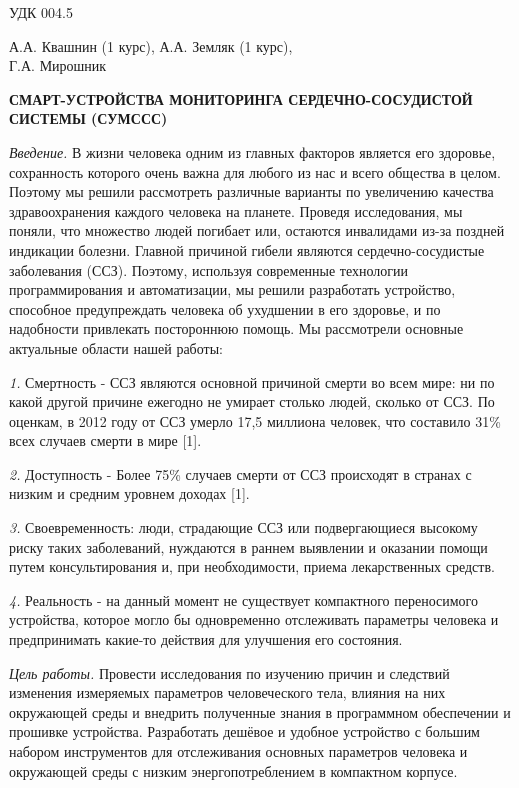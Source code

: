 \documentclass[a4paper, 12pt]{article} %
\begin{document}
	\noindent УДК 004.5
	
	\begin{flushright}
		А.А. Квашнин (1 курс), А.А. Земляк (1 курс),\\
		Г.А. Мирошник
	\end{flushright}
	
	\begin{center}
		\textbf{СМАРТ-УСТРОЙСТВА МОНИТОРИНГА СЕРДЕЧНО-СОСУДИСТОЙ СИСТЕМЫ (СУМССС)}
	\end{center}
	
	\textit{Введение.}
	В жизни человека одним из главных факторов является его
	здоровье, сохранность которого очень важна для любого из нас и всего общества в целом.
	Поэтому мы решили рассмотреть различные варианты по увеличению качества здравоохранения
	каждого человека на планете. Проведя исследования, мы поняли, что множество людей погибает
	или, остаются инвалидами из-за поздней индикации болезни. Главной причиной гибели
	являются сердечно-сосудистые заболевания (ССЗ). Поэтому, используя современные технологии
	программирования и автоматизации, мы решили разработать устройство, способное предупреждать
	человека об ухудшении в его здоровье, и по надобности привлекать постороннюю помощь.
	Мы рассмотрели основные актуальные области нашей работы:
	
	\textit{1.}
	Смертность - ССЗ являются основной причиной смерти во всем мире: ни по какой другой причине
	ежегодно не умирает столько людей, сколько от ССЗ. По оценкам, в 2012 году от ССЗ умерло 17,5
	миллиона человек, что составило 31\% всех случаев смерти в мире [1].
	
	\textit{2.}
	Доступность - Более 75\% случаев смерти от ССЗ происходят в странах с низким и средним уровнем доходах [1].
	
	\textit{3.}
	Своевременность: люди, страдающие ССЗ или подвергающиеся высокому риску таких заболеваний,
	нуждаются в раннем выявлении и оказании помощи путем консультирования и,
	при необходимости, приема лекарственных средств.
	
	\textit{4.}
	Реальность - на данный момент не существует компактного переносимого устройства,
	которое могло бы одновременно отслеживать параметры человека и предпринимать
	какие-то действия для улучшения его состояния.
	
	\textit{Цель работы.}
	Провести исследования по изучению причин и следствий изменения измеряемых параметров человеческого тела,
	влияния на них окружающей среды и внедрить полученные знания в программном обеспечении и прошивке устройства.
	Разработать дешёвое и удобное устройство с большим набором инструментов для отслеживания основных параметров человека
	и окружающей среды с низким энергопотреблением в компактном корпусе.
	
\end{document}
